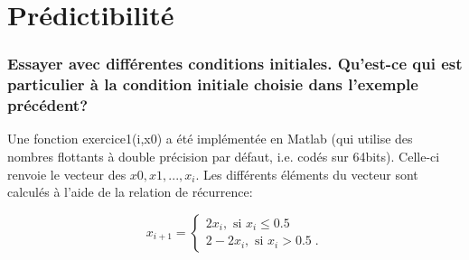 \documentclass[a4paper, 12pt]{report}
\newcommand{\code}[1]{\textsf{#1}}
\begin{document}



\part{Prédictibilité}
\setcounter{section}{0}


\section{Essayer avec différentes conditions initiales.
Qu'est-ce qui est particulier à la condition initiale choisie dans l'exemple
précédent?}

Une fonction \code{exercice1(i,x0)} a été implémentée en Matlab (qui utilise
des nombres flottants à double précision par défaut, i.e. codés sur 64bits). Celle-ci
renvoie le vecteur des $x0,x1,...,x_i$. Les différents éléments du vecteur
sont calculés à l'aide de la relation de récurrence:

\begin{equation}
  x_{i+1} = \left \{
  \begin{aligned}
    2x_i, \text{ si } x_i \le 0.5\\
    2-2x_i, \text{ si } x_i > 0.5 \;.
  \end{aligned} \right.
\end{equation}
\end{document}
